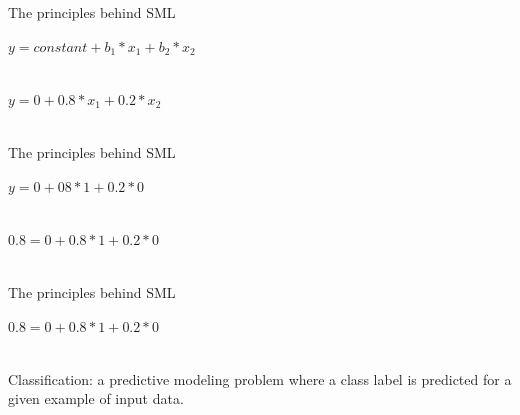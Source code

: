 \documentclass[handout]{beamer}
\begin{document}
	
	\begin{frame}{The principles behind SML} 
		
		\(y = constant + b_1 * x_1 + b_2 * x_2\) \\\
		
		\(y = 0 + 0.8 * x_1 + 0.2 * x_2\) \\\
		
		
		
	\end{frame}
	
	\begin{frame}{The principles behind SML} 
		
		\(y = 0 + 08 * 1 + 0.2 * 0\) \\\
		
		\(0.8 = 0 + 0.8 * 1 + 0.2 * 0\) \\\
		
		
	\end{frame}
	
	\begin{frame}{The principles behind SML} 
		
		\(0.8 = 0 + 0.8 * 1 + 0.2 * 0\) \\\
		
		Classification: a predictive modeling problem where a class label is predicted for a given example of input data. 
		
		
		
		
		
		
	\end{frame}
	
\end{document}
